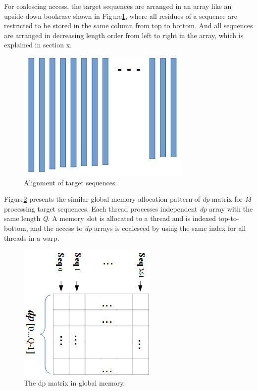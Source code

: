 For coalescing access, the target sequences are arranged in an array like an upside-down bookcase shown in Figure\ref{fig:dbalign}, where all residues of a sequence are restricted to be stored in the same column from top to bottom. And all sequences are arranged in decreasing length order from left to right in the array, which is explained in section x. 

\begin{figure}[!htb]
	\centering
	\includegraphics[totalheight=0.2\textheight]{Figures/dbalign.png}
	\caption{\selectfont Alignment of target sequences.}
	\label{fig:dbalign}
\end{figure}

Figure\ref{fig:dp} presents the similar global memory allocation pattern of \emph{dp} matrix for \emph{M} processing target sequences. Each thread processes independent \emph{dp} array with the same length \emph{Q}. A memory slot is allocated to a thread and is indexed top-to-bottom, and the access to \emph{dp} arrays is coalesced by using the same index for all threads in a warp.

\begin{figure}[!htb]
	\centering
	\includegraphics[totalheight=0.2\textheight]{Figures/dp.png}
	\caption{\selectfont The dp matrix in global memory.}
	\label{fig:dp}
\end{figure}

